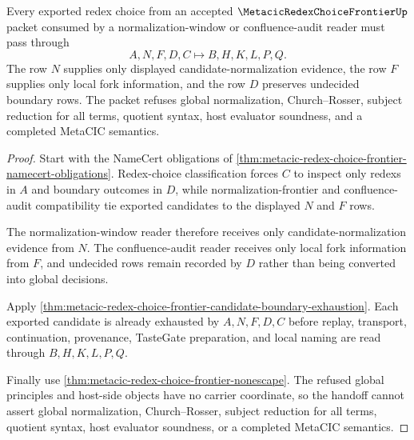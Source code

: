 \begin{theorem}
\label{thm:metacic-redex-choice-frontier-candidate-normalization-handoff}
Every exported redex choice from an accepted $\MetacicRedexChoiceFrontierUp$ packet consumed by a normalization-window or confluence-audit reader must pass through
$$
A,N,F,D,C \longmapsto B,H,K,L,P,Q .
$$
The row $N$ supplies only displayed candidate-normalization evidence, the row $F$ supplies only local fork information, and the row $D$ preserves undecided boundary rows. The packet refuses global normalization, Church--Rosser, subject reduction for all terms, quotient syntax, host evaluator soundness, and a completed MetaCIC semantics.
\end{theorem}
\begin{proof}
Start with the NameCert obligations of \autoref{thm:metacic-redex-choice-frontier-namecert-obligations}. Redex-choice classification forces $C$ to inspect only redexs in $A$ and boundary outcomes in $D$, while normalization-frontier and confluence-audit compatibility tie exported candidates to the displayed $N$ and $F$ rows.

The normalization-window reader therefore receives only candidate-normalization evidence from $N$. The confluence-audit reader receives only local fork information from $F$, and undecided rows remain recorded by $D$ rather than being converted into global decisions.

Apply \autoref{thm:metacic-redex-choice-frontier-candidate-boundary-exhaustion}. Each exported candidate is already exhausted by $A,N,F,D,C$ before replay, transport, continuation, provenance, TasteGate preparation, and local naming are read through $B,H,K,L,P,Q$.

Finally use \autoref{thm:metacic-redex-choice-frontier-nonescape}. The refused global principles and host-side objects have no carrier coordinate, so the handoff cannot assert global normalization, Church--Rosser, subject reduction for all terms, quotient syntax, host evaluator soundness, or a completed MetaCIC semantics.
\end{proof}


